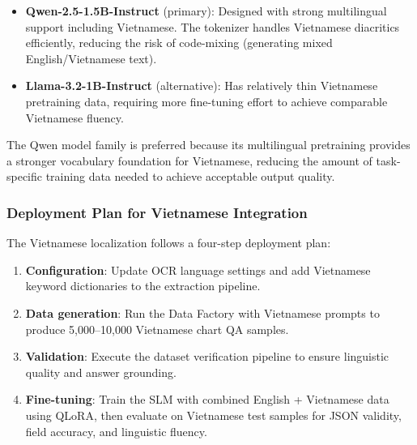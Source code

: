 \begin{itemize}
    \item \textbf{Qwen-2.5-1.5B-Instruct} (primary): Designed with strong multilingual
          support including Vietnamese. The tokenizer handles Vietnamese diacritics
          efficiently, reducing the risk of code-mixing (generating mixed
          English/Vietnamese text).
    \item \textbf{Llama-3.2-1B-Instruct} (alternative): Has relatively thin Vietnamese
          pretraining data, requiring more fine-tuning effort to achieve comparable
          Vietnamese fluency.
\end{itemize}

The Qwen model family is preferred because its multilingual pretraining provides a
stronger vocabulary foundation for Vietnamese, reducing the amount of task-specific
training data needed to achieve acceptable output quality.

\subsubsection{Deployment Plan for Vietnamese Integration}

The Vietnamese localization follows a four-step deployment plan:

\begin{enumerate}
    \item \textbf{Configuration}: Update OCR language settings and add Vietnamese keyword
          dictionaries to the extraction pipeline.
    \item \textbf{Data generation}: Run the Data Factory with Vietnamese prompts to
          produce 5,000--10,000 Vietnamese chart QA samples.
    \item \textbf{Validation}: Execute the dataset verification pipeline to ensure
          linguistic quality and answer grounding.
    \item \textbf{Fine-tuning}: Train the SLM with combined English + Vietnamese data
          using QLoRA, then evaluate on Vietnamese test samples for JSON validity,
          field accuracy, and linguistic fluency.
\end{enumerate}